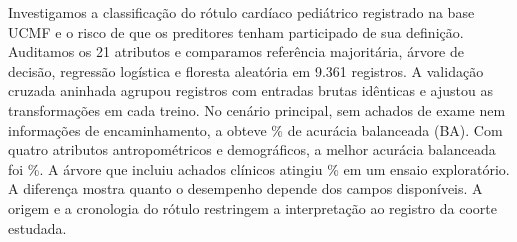 Investigamos a classificação do rótulo cardíaco pediátrico registrado na base UCMF e o risco de que os preditores tenham participado de sua definição. Auditamos os 21 atributos e comparamos referência majoritária, árvore de decisão, regressão logística e floresta aleatória em 9.361 registros. A validação cruzada aninhada agrupou registros com entradas brutas idênticas e ajustou as transformações em cada treino. No cenário principal, sem achados de exame nem informações de encaminhamento, a \FisioBestFamily{} obteve \FisioBestBA\% de acurácia balanceada (BA). Com quatro atributos antropométricos e demográficos, a melhor acurácia balanceada foi \StrictBestBA\%. A árvore que incluiu achados clínicos atingiu \ClinTreeBA\% em um ensaio exploratório. A diferença mostra quanto o desempenho depende dos campos disponíveis. A origem e a cronologia do rótulo restringem a interpretação ao registro da coorte estudada.
